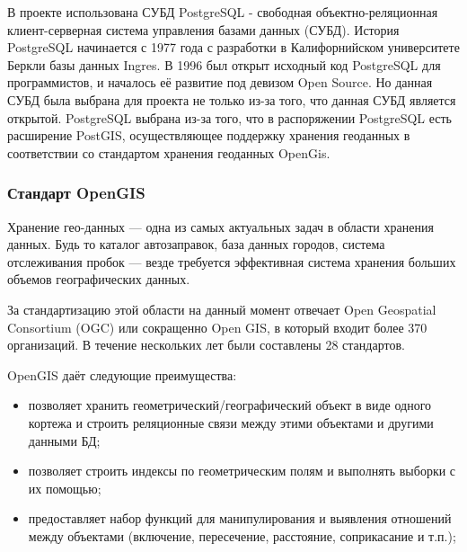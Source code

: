 \documentclass[12pt,a4paper,oneside]{article} %
\begin{document}
В проекте использована СУБД PostgreSQL - свободная \linebreak
объектно-реляционная клиент-серверная система управления базами \linebreak
данных (СУБД). История PostgreSQL начинается с 1977 года с \linebreak
разработки в Калифорнийском университете Беркли базы данных Ingres. \linebreak
В 1996 был открыт исходный код PostgreSQL для программистов, и \linebreak
началось её развитие под девизом Open Source. Но данная СУБД \linebreak
была выбрана для проекта не только из-за того, что данная СУБД \linebreak
является открытой. PostgreSQL выбрана из-за того, что в \linebreak
распоряжении PostgreSQL есть расширение PostGIS, осуществляющее \linebreak
поддержку хранения геоданных в соответствии со стандартом \linebreak
хранения геоданных OpenGis.

\newpage
\subsubsection{Стандарт OpenGIS}
Хранение гео-данных — одна из самых актуальных задач в области хранения \linebreak
данных. Будь то каталог автозаправок, база данных городов, система \linebreak
отслеживания пробок — везде требуется эффективная система хранения \linebreak
больших объемов географических данных.

За стандартизацию этой области на данный момент отвечает \linebreak
Open Geospatial Consortium (OGC) или сокращенно Open GIS, в который \linebreak
входит более 370 организаций. В течение нескольких лет были \linebreak
составлены 28 стандартов.

OpenGIS даёт следующие преимущества:

\begin{itemize}
\item позволяет хранить геометрический/географический объект в виде \linebreak
одного кортежа и строить реляционные связи между этими объектами \linebreak
и другими данными БД;
\item позволяет строить индексы по геометрическим полям и выполнять \linebreak
выборки с их помощью;
\item предоставляет набор функций для манипулирования и выявления \linebreak
отношений между объектами (включение, пересечение, расстояние, \linebreak
соприкасание и т.п.);
\end{itemize}
\end{document}
